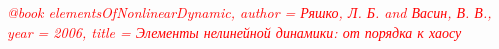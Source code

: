 \documentclass[12pt, a4paper]{article}
\newcommand{\comment}[1]{\textcolor{red}{\emph{#1}}}
\begin{document}
    \tableofcontents

    

    \newpage

    

    \newpage

    

    \newpage

    

    \comment{@book{
  elementsOfNonlinearDynamic,
  author = {Ряшко, Л. Б. and Васин, В. В.},
  year = {2006},
  title = {Элементы нелинейной динамики: от порядка к хаосу}
}}

    
    
\end{document}
